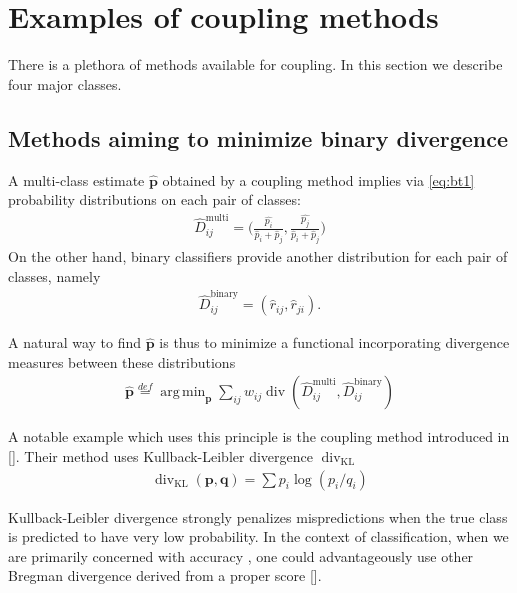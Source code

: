 \documentclass[twoside,11pt]{article}
\DeclareMathOperator*{\divm}{div}
\DeclareMathOperator*{\argmin}{arg\,min}
\begin{document}


\section{Examples of coupling methods} \label{sec:coupling}

There is a plethora of methods available for coupling. In this section we describe four major classes.

\subsection{Methods aiming to minimize binary divergence}

A multi-class estimate $\hat{\boldsymbol{p}}$ obtained by a coupling method implies via \eqref{eq:bt1} probability distributions on each pair of classes:
\begin{align*}
	\hat D_{ij}^\textrm{multi}= \biggl(\frac{\hat{p_i}}{\hat p_i + \hat p_j},\frac{\hat{p_j}}{\hat p_i + \hat p_j}\biggr)	
\end{align*}
On the other hand, binary classifiers provide another distribution for each pair of  classes, namely
\begin{align*}
\hat D_{ij}^\textrm{binary} = (\hat r_{ij}, \hat r_{ji}).
\end{align*}

A natural way to find  $\hat{\boldsymbol{p}}$ is thus to minimize a functional incorporating divergence measures between these distributions
\begin{align*}
\hat{\boldsymbol{p}} \stackrel{def}{=} \argmin_{\boldsymbol{p}} \sum_{ij} w_{ij} \divm (\hat D_{ij}^\textrm{multi}, \hat D_{ij}^\textrm{binary})
\end{align*}

A notable example which uses this principle is the coupling method introduced in [\cite{hastie1998classification}]. Their method uses Kullback-Leibler divergence $\divm_\textrm{KL}$
\begin{align*}
	\divm\nolimits_\textrm{KL} (\boldsymbol{p}, \boldsymbol{q})= \sum p_i \log (p_i/ q_i)
\end{align*}

Kullback-Leibler divergence strongly penalizes  mispredictions when the true class is predicted to have very low probability. In the context of classification, when we are primarily concerned with accuracy , one could advantageously use other Bregman divergence derived from a proper score [\cite{gneiting2007strictly, buja2005loss}].
 
\end{document}
